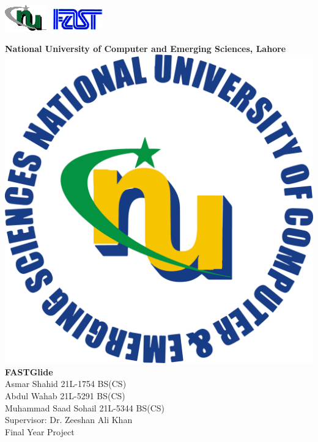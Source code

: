 \documentclass{FastFyp}
\begin{document}
\newcommand{\supervisor}{Dr. Zeeshan Ali Khan}
\newcommand{\university}{National University of Computer and Emerging Sciences, Lahore}
\newcommand{\fyptitle}{FASTGlide}
\newcommand{\degree}{BS}
\newcommand{\Studentone}{Asmar Shahid     21L-1754    BS(CS)} 
\newcommand{\Studenttwo}{Abdul Wahab     21L-5291    BS(CS)}
\newcommand{\Studentthree}{Muhammad Saad Sohail     21L-5344    BS(CS)}
\date{\today}
\renewcommand{\contentsname}{Table of Contents}

\makeatletter
    \begin{titlepage}
        \includegraphics[width=0.2\linewidth]{Figures/nulogo.png}\hfill
        \includegraphics[width=0.2\linewidth]{Figures/fast.png}\\
        \begin{center} 
            {\large\bfseries \university}\\[7ex]
            \includegraphics[width=0.4\linewidth]{Figures/fastlogo.png}\\[8ex]
            {\huge \bfseries  \fyptitle }\\[10ex] 
            {\Studentone}\\{\Studenttwo}\\{\Studentthree}\\[4ex] 
            {Supervisor: \supervisor} \\ [10ex]
            {Final Year Project}\\
            {\large \@date}
        \end{center}
    \end{titlepage}    
\makeatother
\frontmatter
\end{document}
